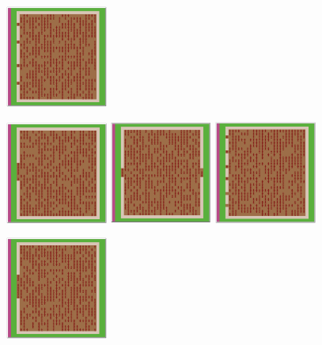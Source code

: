 \documentclass[12pt,letterpaper]{article}
\begin{document}
\begin{figure}[ht]
\begin{minipage}[b]{.75\linewidth}
    \includegraphics[width=0.3\textwidth]{./figures/exit_dims_4_c.png}
  \end{minipage}
  \begin{minipage}[b]{.75\linewidth}
    \includegraphics[width=0.3\textwidth]{./figures/exit_dims_6_a.png}
    \includegraphics[width=0.3\textwidth]{./figures/exit_dims_6_b.png}
    \includegraphics[width=0.3\textwidth]{./figures/exit_dims_6_c.png}
  \end{minipage}
  \begin{minipage}[b]{.75\linewidth}
    \includegraphics[width=0.3\textwidth]{./figures/exit_dims_8_a.png}

\end{minipage}
\end{figure}
\end{document}
